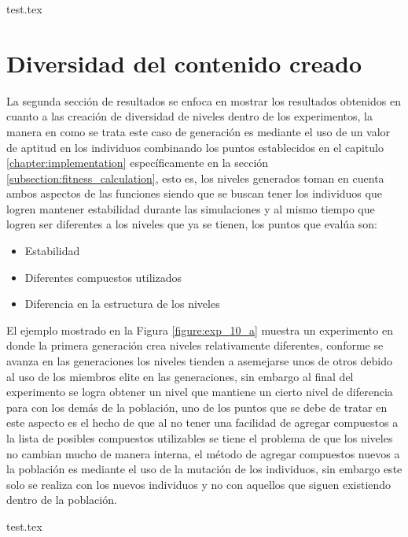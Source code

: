 {test.tex}

\newpage

\section{Diversidad del contenido creado}
\label{section:chap6_diversity_results}

La segunda sección de resultados se enfoca en mostrar los resultados obtenidos
en cuanto a las creación de diversidad de niveles dentro de los experimentos, la
manera en como se trata este caso de generación es mediante el uso de un valor
de aptitud en los individuos combinando los puntos establecidos en el capitulo
\ref{chapter:implementation} específicamente en la sección
\ref{subsection:fitness_calculation}, esto es, los niveles generados toman en
cuenta ambos aspectos de las funciones siendo que se buscan tener los individuos
que logren mantener estabilidad durante las simulaciones y al mismo tiempo que
logren ser diferentes a los niveles que ya se tienen, los puntos que evalúa son:

\begin{itemize}
  \item Estabilidad
  \item Diferentes compuestos utilizados
  \item Diferencia en la estructura de los niveles
\end{itemize}

El ejemplo mostrado en la Figura \ref{figure:exp_10_a} muestra un experimento en
donde la primera generación crea niveles relativamente diferentes, conforme se
avanza en las generaciones los niveles tienden a asemejarse unos de otros debido
al uso de los miembros elite en las generaciones, sin embargo al final del
experimento se logra obtener un nivel que mantiene un cierto nivel de diferencia
para con los demás de la población, uno de los puntos que se debe de tratar en
este aspecto es el hecho de que al no tener una facilidad de agregar compuestos
a la lista de posibles compuestos utilizables se tiene el problema de que los
niveles no cambian mucho de manera interna, el método de agregar compuestos
nuevos a la población es mediante el uso de la mutación de los individuos, sin
embargo este solo se realiza con los nuevos individuos y no con aquellos que
siguen existiendo dentro de la población.

{test.tex}

